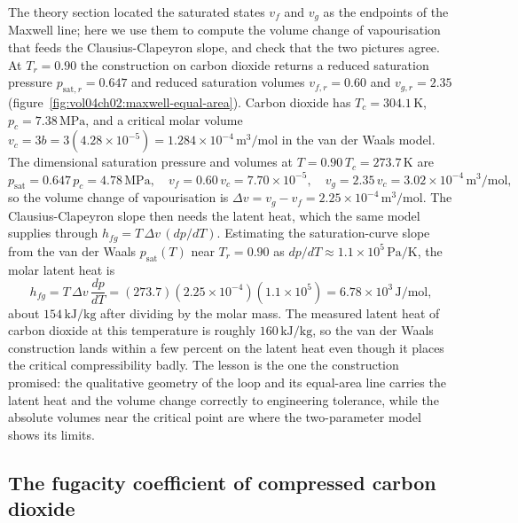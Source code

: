 The theory section located the saturated states $v_f$ and $v_g$ as the
endpoints of the Maxwell line; here we use them to compute the volume change
of vapourisation that feeds the Clausius-Clapeyron slope, and check that the
two pictures agree. At $T_r = 0.90$ the construction on carbon dioxide
returns a reduced saturation pressure $p_{\text{sat},r} = 0.647$ and reduced
saturation volumes $v_{f,r} = 0.60$ and $v_{g,r} = 2.35$
(figure~\ref{fig:vol04ch02:maxwell-equal-area}). Carbon dioxide has $T_c =
304.1\,\si{\kelvin}$, $p_c = 7.38\,\text{MPa}$, and a critical molar volume
$v_c = 3b = 3(4.28\times 10^{-5}) = 1.284\times 10^{-4}\,\text{m}^3/
\text{mol}$ in the van der Waals model. The dimensional saturation pressure
and volumes at $T = 0.90\,T_c = 273.7\,\si{\kelvin}$ are
\[
p_{\text{sat}} = 0.647\,p_c = 4.78\,\text{MPa}, \quad
v_f = 0.60\,v_c = 7.70\times 10^{-5}, \quad
v_g = 2.35\,v_c = 3.02\times 10^{-4}\,\text{m}^3/\text{mol},
\]
so the volume change of vapourisation is $\Delta v = v_g - v_f = 2.25\times
10^{-4}\,\text{m}^3/\text{mol}$. The Clausius-Clapeyron slope then needs the
latent heat, which the same model supplies through $h_{fg} = T\,\Delta
v\,(dp/dT)$. Estimating the saturation-curve slope from the van der Waals
$p_{\text{sat}}(T)$ near $T_r = 0.90$ as $dp/dT \approx 1.1\times 10^{5}\,
\text{Pa}/\si{\kelvin}$, the molar latent heat is
\[
h_{fg} = T\,\Delta v\,\frac{dp}{dT} = (273.7)(2.25\times 10^{-4})(1.1\times
10^{5}) = 6.78\times 10^{3}\,\text{J}/\text{mol},
\]
about $154\,\text{kJ}/\text{kg}$ after dividing by the molar mass. The
measured latent heat of carbon dioxide at this temperature is roughly
$160\,\text{kJ}/\text{kg}$, so the van der Waals construction lands within
a few percent on the latent heat even though it places the critical
compressibility badly. The lesson is the one the construction promised: the
qualitative geometry of the loop and its equal-area line carries the latent
heat and the volume change correctly to engineering tolerance, while the
absolute volumes near the critical point are where the two-parameter model
shows its limits.

\subsection{The fugacity coefficient of compressed carbon dioxide}

